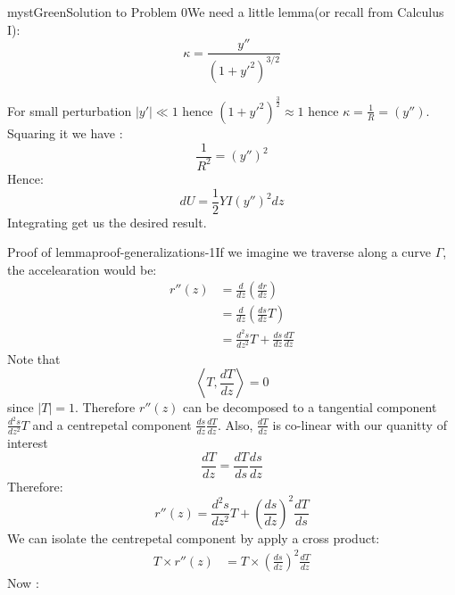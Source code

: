 \begin{mystadmonition}{mystGreen}{Solution to Problem 0}We need a little lemma(or recall from Calculus I):
\begin{equation}
\kappa = \frac{y''}{(1+y'^2)^{3/2}}
\end{equation}

For small perturbation $|y'|\ll 1$ hence $(1+y'^2)^{\frac32} \approx 1$ hence
$\kappa = \frac{1}{R}=(y'')$. Squaring it we have :
\begin{equation}
\frac{1}{R^2}=(y'')^2
\end{equation}
Hence:
\begin{equation}
dU=\frac12 YI (y'')^2 dz
\end{equation}
Integrating get us the desired result.

\begin{mystthmproof}{Proof of lemma}{proof-generalizations-1}If we imagine we traverse along a curve $\Gamma$, the accelearation would be:
\begin{equation}
\begin{aligned}
r''(z) &= \frac{d}{dz}\left(\frac{dr}{dz}\right) \\
&=  \frac{d}{dz}\left(\frac{ds}{dz}T\right)  \\
&= \frac{d^2s}{dz^2}T + \frac{ds}{dz}\frac{dT}{dz}
\end{aligned}
\end{equation}
Note that
\begin{equation}
\left\langle T, \frac{dT}{dz}\right\rangle=0
\end{equation}
since $|T|=1$. Therefore $r''(z)$ can be decomposed to a tangential component $\frac{d^2s}{dz^2}T$ and a centrepetal component $\frac{ds}{dz}\frac{dT}{dz}$.
Also, $\frac{dT}{dz}$ is co-linear with our quanitty of interest
\begin{equation}
\frac{dT}{dz}=\frac{dT}{ds}\frac{ds}{dz}
\end{equation}
Therefore:
\begin{equation}
\boxed{r''(z)= \frac{d^2s}{dz^2}T + \left(\frac{ds}{dz}\right)^2 \frac{dT}{ds}}
\end{equation}
We can isolate the centrepetal component by apply a cross product:
\begin{equation}
\begin{aligned}
T\times r''(z) &= T \times \left(\frac{ds}{dz}\right)^2\frac{dT}{dz}
\end{aligned}
\end{equation}
Now :


\end{mystthmproof}
\end{mystadmonition}
